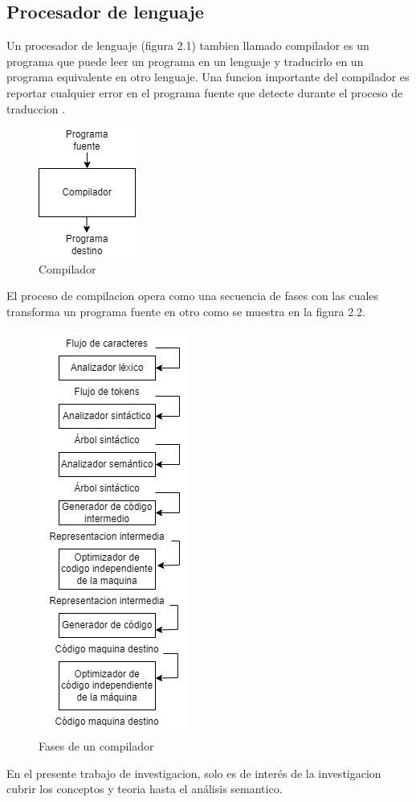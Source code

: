 \subsection{Procesador de lenguaje}
Un procesador de lenguaje (figura 2.1) tambien llamado compilador es un programa que puede leer un programa en un lenguaje y traducirlo en un programa equivalente en otro lenguaje. Una funcion importante del compilador es reportar cualquier error en el programa fuente que detecte durante el proceso de traduccion \cite{aho2008compiladores}.
\begin{figure}[htb]
\centering
\includegraphics[scale=0.8]{imagenes/compilador}
\caption{Compilador}
\end{figure}
El proceso de compilacion opera como una secuencia de fases con las cuales transforma un programa fuente en otro como se muestra en la figura 2.2.
\begin{figure}[htb]
\centering
\includegraphics[scale=0.8]{imagenes/fasesCompilador}
\caption{Fases de un compilador}
\end{figure}
En el presente trabajo de investigacion, solo es de interés de la investigacion cubrir los conceptos y teoria hasta el análisis semantico.
